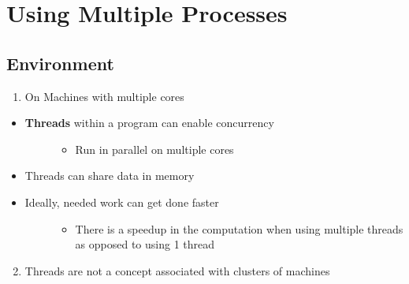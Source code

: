 \documentclass[letterpaper,10pt,openany,oneside]{sphinxmanual}
\begin{document}
\chapter{Using Multiple Processes}
\label{URLSpider/URLSpider:using-multiple-processes}\label{URLSpider/URLSpider::doc}

\section{Environment}
\label{URLSpider/URLSpider:environment}\begin{enumerate}
\item {} 
On Machines with multiple cores

\end{enumerate}
\begin{itemize}
\item {} \begin{description}
\item[{\textbf{Threads} within a program can enable concurrency}] \leavevmode\begin{itemize}
\item {} 
Run in parallel on multiple cores

\end{itemize}

\end{description}

\item {} 
Threads can share data in memory

\item {} \begin{description}
\item[{Ideally, needed work can get done faster}] \leavevmode\begin{itemize}
\item {} 
There is a speedup in the computation when using multiple threads as opposed to using 1 thread

\end{itemize}

\end{description}

\end{itemize}
\begin{enumerate}
\setcounter{enumi}{1}
\item {} 
Threads are not a concept associated with clusters of machines

\end{enumerate}
\end{document}
